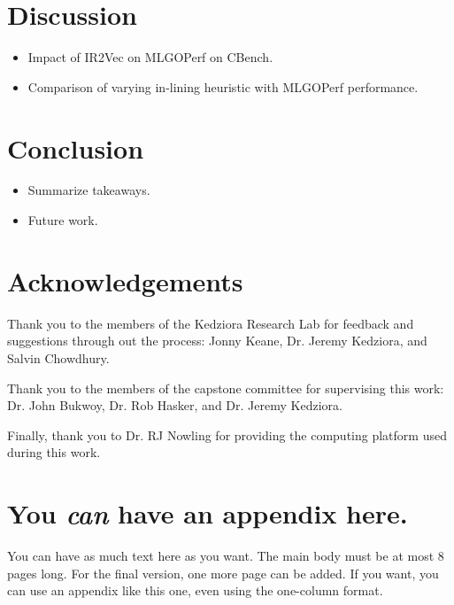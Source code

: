 \documentclass[nohyperref]{article}
\theoremstyle{plain}
\theoremstyle{definition}
\theoremstyle{remark}
\begin{document}



\section{Discussion}
\label{discussion}
\begin{itemize}
\item Impact of IR2Vec on MLGOPerf on CBench\@.
\item Comparison of varying in-lining heuristic with MLGOPerf performance\@.
\end{itemize}



\section{Conclusion}
\label{conclusion}
\begin{itemize}
\item Summarize takeaways\@.
\item Future work\@.
\end{itemize}

\section*{Acknowledgements}

Thank you to the members of the Kedziora Research Lab for feedback and suggestions through out the process: Jonny Keane, Dr. Jeremy Kedziora, and Salvin Chowdhury.

Thank you to the members of the capstone committee for supervising this work: Dr. John Bukwoy, Dr. Rob Hasker, and Dr. Jeremy Kedziora.

Finally, thank you to Dr. RJ Nowling for providing the computing platform used during this work.

\nocite{langley00}





\newpage
\appendix
\onecolumn
\section{You \emph{can} have an appendix here.}

You can have as much text here as you want. The main body must be at most $8$ pages long.
For the final version, one more page can be added.
If you want, you can use an appendix like this one, even using the one-column format.
\end{document}
